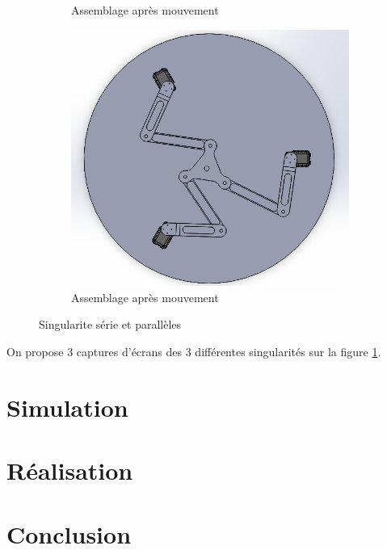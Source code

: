 \documentclass[a4paper, 11pt]{report}
\begin{document}
\begin{figure}[!tbh]
\begin{subfigure}[t]{0.48\textwidth}
        \caption{Assemblage après mouvement}
    \end{subfigure}
    \begin{subfigure}[t]{0.48\textwidth}
        \centering
        \includegraphics[width=\textwidth]{Figures/singularite parallele concourante.png}
        \caption{Assemblage après mouvement}
    \end{subfigure}
    \caption{Singularite série et parallèles}
    \label{fig:singularity}
\end{figure}

On propose 3 captures d'écrans des 3 différentes singularités sur la figure \ref{fig:singularity}.

\section{Simulation}

\section{Réalisation}

\section*{Conclusion}


\newpage
\nocite{*}
\printbibliography
\end{document}
